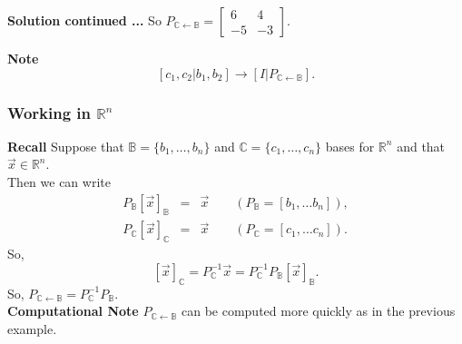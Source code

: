  \begin{frame}[fragile]
\textbf{Solution continued ...}
So $P_{\mathbb C\leftarrow\mathbb B}= \left[\begin{array}{rr} 6&4\\-5&-3  \end{array}\right]$.




\textbf{Note}
$$
\left[ c_1, c_2 | b_1, b_2\right] \rightarrow \left[ I | P_{\mathbb C\leftarrow\mathbb B}\right].
$$

\end{frame}





 \begin{frame}[fragile]\frametitle{Working in $\mathbb R^n$}
\textbf{Recall}
 Suppose that $\mathbb B =\{b_1, \dots, b_n\}$ and $\mathbb C=\{c_1, \dots, c_n\}$ bases for $\mathbb R^n$ and that $\vec{x}\in \mathbb R^n$.  \\ 
 Then we can write 
 \begin{eqnarray*}
   P_{\mathbb B}[\vec{x}]_{\mathbb B}&=& \vec{x}  \qquad (P_{\mathbb B}=[b_1, \dots b_n]),  \\
   P_{\mathbb C}[\vec{x}]_{\mathbb C}&=& \vec{x}  \qquad (P_{\mathbb C}=[c_1, \dots c_n]). 
 \end{eqnarray*}
 So,
 $$
 [\vec{x}]_{\mathbb C} =  P_{\mathbb C}^{-1}\vec{x} =  P_{\mathbb C}^{-1}P_{\mathbb B}[\vec{x}]_{\mathbb B}.
 $$  
 So, $P_{\mathbb C\leftarrow\mathbb B}=P_{\mathbb C}^{-1}P_{\mathbb B}$.  \\ 



\textbf{Computational Note}
$P_{\mathbb C\leftarrow\mathbb B}$ can be computed more quickly as in the previous example.

\end{frame}











